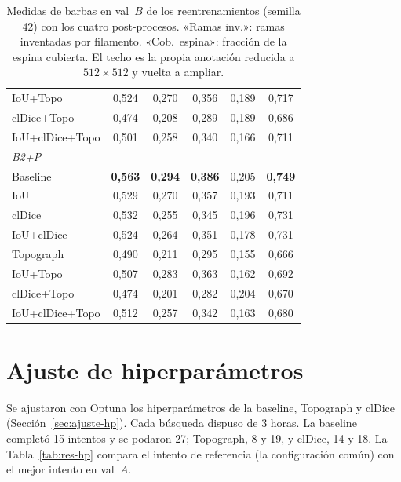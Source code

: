 \begin{table}[htbp]
\begin{tabular}{@{}lccccc@{}}
IoU+Topo & 0,524 & 0,270 & 0,356 & 0,189 & 0,717\\
clDice+Topo & 0,474 & 0,208 & 0,289 & 0,189 & 0,686\\
IoU+clDice+Topo & 0,501 & 0,258 & 0,340 & 0,166 & 0,711\\
\midrule
\multicolumn{6}{l}{\emph{B2+P}}\\
Baseline & \textbf{0,563} & \textbf{0,294} & \textbf{0,386} & 0,205 & \textbf{0,749}\\
IoU & 0,529 & 0,270 & 0,357 & 0,193 & 0,711\\
clDice & 0,532 & 0,255 & 0,345 & 0,196 & 0,731\\
IoU+clDice & 0,524 & 0,264 & 0,351 & 0,178 & 0,731\\
Topograph & 0,490 & 0,211 & 0,295 & 0,155 & 0,666\\
IoU+Topo & 0,507 & 0,283 & 0,363 & 0,162 & 0,692\\
clDice+Topo & 0,474 & 0,201 & 0,282 & 0,204 & 0,670\\
IoU+clDice+Topo & 0,512 & 0,257 & 0,342 & 0,163 & 0,680\\
\bottomrule
\end{tabular}
\caption{Medidas de barbas en val~$B$ de los reentrenamientos (semilla
42) con los cuatro post-procesos. «Ramas inv.»: ramas inventadas por filamento. «Cob.\ espina»:
fracción de la espina cubierta. El techo es la propia anotación reducida
a $512\times512$ y vuelta a ampliar.}
\label{tab:res-barbas}
\end{table}

\section{Ajuste de hiperparámetros}
\label{sec:anx-hp}

Se ajustaron con Optuna los hiperparámetros de la baseline, Topograph y
clDice (Sección~\ref{sec:ajuste-hp}). Cada búsqueda dispuso de 3 horas.
La baseline completó 15 intentos y se podaron 27; Topograph, 8 y 19, y
clDice, 14 y 18. La Tabla~\ref{tab:res-hp} compara el intento de
referencia (la configuración común) con el mejor intento en val~$A$.

